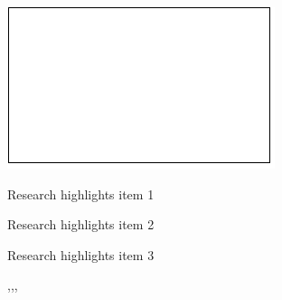 \documentclass[a4paper,fleqn]{cas-sc}
\begin{document}
\begin{abstract}
A decline in Atlantic meridional overturning circulation (AMOC) strength has been observed between 2004 and 2008 by the RAPID array, this weakened state of the AMOC persisting until 2017. Climate model and paleo-oceanographic research suggests that the AMOC may have been declining for decades or even centuries before this, however direct observations are sparse prior to 2004, giving only ‘snapshots’ of the overturning circulation. Previous studies have used linear models based on upper layer temperature anomalies to extend earlier, but these ignore changes in the deep circulation that are beginning to emerge in the observations of AMOC decline.

We use a linear statistical model of AMOC variability based on RAPID data, and associated physically with changes in thickness of the persistent upper, intermediate and deep layers at 26\textdegree N. Boundary density anomalies at depths representing each layer are used to develop a multiple linear regression model which explains approximately 70\% variance in the open ocean component. Using this regression model, we can estimate relative AMOC strength from a reduced number of observations, opening up the use of historical data that are insufficient for the usual AMOC estimation method.
\end{abstract}

\begin{graphicalabstract}
\includegraphics{figs/grabs.pdf}
\end{graphicalabstract}

\begin{highlights}
\item Research highlights item 1
\item Research highlights item 2
\item Research highlights item 3
\end{highlights}

\begin{keywords}
 \sep \AMOC \sep  \sep 
\end{keywords}
\end{document}
